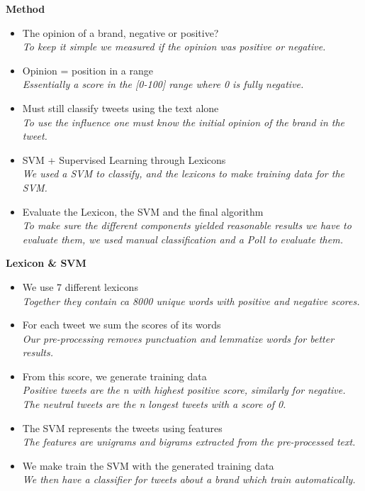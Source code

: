 \documentclass[landscape,20pt]{extarticle}
\newcommand*{\TitleFont}{\Huge \bf}
\newcommand*{\TextFont}{\normalsize \it}
\begin{document}
\newpage
\thispagestyle{empty}
\mbox{}

\clearpage
\thispagestyle{empty}

{\TitleFont Method}

\begin{itemize}
\item The opinion of a brand, negative or positive?\\
{\TextFont To keep it simple we measured if the opinion was positive or negative.}
\item Opinion = position in a range\\
{\TextFont Essentially a score in the [0-100] range where 0 is fully negative.}
\item Must still classify tweets using the text alone\\
{\TextFont To use the influence one must know the initial opinion of the brand in the tweet.}
\item SVM + Supervised Learning through Lexicons\\
{\TextFont We used a SVM to classify, and the lexicons to make training data for the SVM.}
\item Evaluate the Lexicon, the SVM and the final algorithm\\
{\TextFont To make sure the different components yielded reasonable results we have to \\evaluate them, we used manual classification and a Poll to evaluate them.}
\end{itemize}

\newpage
\thispagestyle{empty}
\mbox{}

\clearpage
\thispagestyle{empty}

{\TitleFont Lexicon \& SVM}

\begin{itemize}
\item We use 7 different lexicons\\
{\TextFont Together they contain ca 8000 unique words with positive and negative scores.}
\item For each tweet we sum the scores of its words\\
{\TextFont Our pre-processing removes punctuation and lemmatize words for better results.}
\item From this score, we generate training data\\
{\TextFont Positive tweets are the \textit{n} with highest positive score, similarly for negative.\\
The neutral tweets are the \textit{n} longest tweets with a score of 0.}
\item The SVM represents the tweets using features\\
{\TextFont The features are unigrams and bigrams extracted from the pre-processed text.}
\item We make train the SVM with the generated training data\\
{\TextFont We then have a classifier for tweets about a brand which train automatically.}
\end{itemize}
\end{document}
